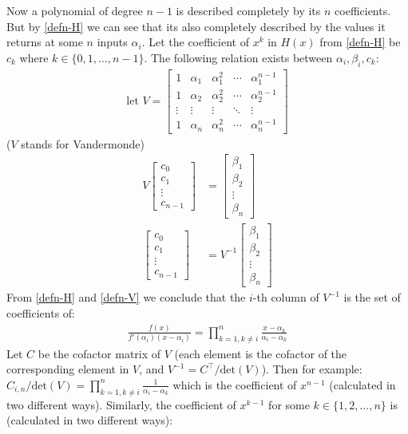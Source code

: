 \documentclass{article}
\begin{document}
Now a polynomial of degree $n-1$ is described completely by its $n$ coefficients. But by \eqref{defn-H} we can see that its also completely described by the values it returns at some $n$ inputs $\alpha_i$. Let the coefficient of $x^k$ in $H(x)$ from \eqref{defn-H} be $c_k$ where $k \in \{0,1,\dots,n-1\}$. The following relation exists between $\alpha_i, \beta_i, c_k$:
\begin{align}
    \textrm{let } V = 
    \begin{bmatrix}
        1 & \alpha_1 & \alpha_1^2 & \cdots & \alpha_1^{n-1} \\
        1 & \alpha_2 & \alpha_2^2 & \cdots & \alpha_2^{n-1} \\
        \vdots & \vdots & \vdots & \ddots & \vdots \\
        1 & \alpha_n & \alpha_n^2 & \cdots & \alpha_n^{n-1}
    \end{bmatrix}
\end{align}
($V$ stands for Vandermonde)
\begin{align}
    V \begin{bmatrix}c_0 \\ c_1 \\ \vdots \\ c_{n-1}\end{bmatrix} &= \begin{bmatrix}\beta_1 \\ \beta_2 \\ \vdots \\ \beta_{n} \end{bmatrix} \\
    \begin{bmatrix}c_0 \\ c_1 \\ \vdots \\ c_{n-1}\end{bmatrix} &= V^{-1} \begin{bmatrix}\beta_1 \\ \beta_2 \\ \vdots \\ \beta_{n} \end{bmatrix} \label{defn-V}
\end{align}
From \eqref{defn-H} and \eqref{defn-V} we conclude that the $i$-th column of $V^{-1}$ is the set of coefficients of:
\begin{align}
    \frac{f(x)}{f'(\alpha_i)(x-\alpha_i)} = \prod_{k=1, k\neq i}^{n} \frac{x-\alpha_k}{\alpha_i - \alpha_k}
\end{align}
Let $C$ be the cofactor matrix of $V$ (each element is the cofactor of the corresponding element in $V$, and $V^{-1} = C^\top/\textrm{det}(V)$). Then for example: $C_{i,n}/\textrm{det}(V) = \prod_{k=1, k\neq i}^{n} \frac{1}{\alpha_i - \alpha_k}$ which is the coefficient of $x^{n-1}$ (calculated in two different ways). Similarly, the coefficient of $x^{k-1}$ for some $k \in \{1,2,\dots,n\}$ is (calculated in two different ways):
\end{document}
